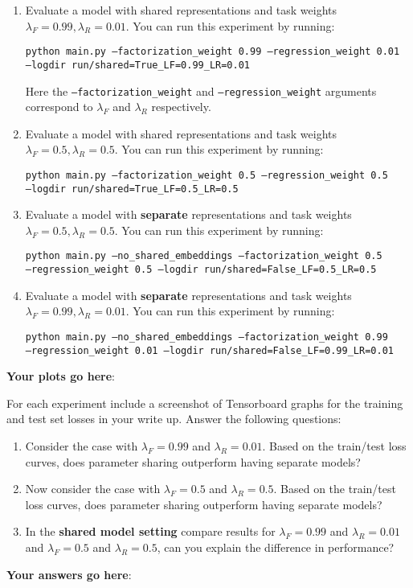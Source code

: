 \documentclass[12pt]{article}
\begin{document}
\begin{enumerate}
    \item Evaluate a model with shared representations and task weights $\lambda_F=0.99, \lambda_R=0.01$. You can run this experiment by running:
    
    \texttt{python main.py --factorization\_weight 0.99 --regression\_weight 0.01 \\--logdir run/shared=True\_LF=0.99\_LR=0.01}
    
    Here the \texttt{--factorization\_weight} and \texttt{--regression\_weight} arguments correspond to $\lambda_F$ and  $\lambda_R$ respectively.
    
    \item Evaluate a model with shared representations and task weights $\lambda_F=0.5, \lambda_R=0.5$. You can run this experiment by running:    
    
    \texttt{python main.py --factorization\_weight 0.5 --regression\_weight 0.5 \\--logdir run/shared=True\_LF=0.5\_LR=0.5}
    
    \item Evaluate a model with \textbf{separate} representations and task weights $\lambda_F=0.5, \lambda_R=0.5$. You can run this experiment by running:    
    
    \texttt{python main.py --no\_shared\_embeddings --factorization\_weight 0.5 \\ --regression\_weight 0.5 --logdir run/shared=False\_LF=0.5\_LR=0.5}
    
     \item Evaluate a model with \textbf{separate} representations and task weights $\lambda_F=0.99, \lambda_R=0.01$. You can run this experiment by running:    
    
    \texttt{python main.py --no\_shared\_embeddings --factorization\_weight 0.99 \\ --regression\_weight 0.01 --logdir run/shared=False\_LF=0.99\_LR=0.01}
    
\end{enumerate}

\noindent\textbf{Your plots go here}:


For each experiment include a screenshot of Tensorboard graphs for the training and test set losses in your write up. Answer the following questions:

\begin{enumerate}
    \item Consider the case with $\lambda_F=0.99$ and $\lambda_R=0.01$. Based on the train/test loss curves, does parameter sharing outperform having separate models? 
    
    \item Now consider the case with $\lambda_F=0.5$ and $\lambda_R=0.5$.  Based on the train/test loss curves, does parameter sharing outperform having separate models? 
    
    \item In the \textbf{shared model setting} compare results for $\lambda_F=0.99$ and $\lambda_R=0.01$ and $\lambda_F=0.5$ and $\lambda_R=0.5$, can you explain the difference in performance?
\end{enumerate}

\noindent\textbf{Your answers go here}:



\newpage


\end{document}
